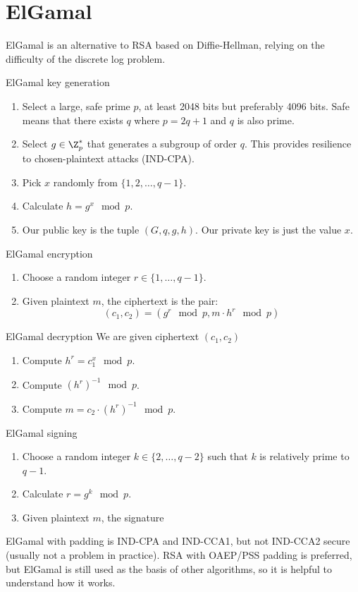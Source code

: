 \section{ElGamal}
ElGamal is an alternative to RSA based on Diffie-Hellman, relying on the difficulty of the discrete log problem.

\begin{tecbox}{ElGamal key generation}{}
    \begin{enumerate}
        \item Select a large, safe prime $p$, at least 2048 bits but preferably 4096 bits. Safe means that there exists $q$ where $p = 2q + 1$ and $q$ is also prime.
        \item Select $g \in \Z_p^*$ that generates a subgroup of order $q$. This provides resilience to chosen-plaintext attacks (IND-CPA).
        \item Pick $x$ randomly from $\{1, 2, \ldots, q -1\}$.
        \item Calculate $h = g^x \mod{p}$.
        \item Our public key is the tuple $(G, q, g, h)$. Our private key is just the value $x$.
    \end{enumerate}
\end{tecbox}

\begin{tecbox}{ElGamal encryption}{}
    \begin{enumerate}
        \item Choose a random integer $r \in \{1, \ldots, q- 1\}$.
        \item Given plaintext $m$, the ciphertext is the pair:
        \[ (c_1, c_2) = (g^r \mod{p}, m \cdot h^r \mod{p}) \]
    \end{enumerate}
\end{tecbox}

\begin{tecbox}{ElGamal decryption}{}
    We are given ciphertext $(c_1, c_2)$
    \begin{enumerate}
        \item Compute $h^r = c_1^x \mod{p}$.
        \item Compute $(h^r)^{-1} \mod{p}$.
        \item Compute $m = c_2 \cdot (h^r)^{-1} \mod{p}$.
    \end{enumerate}
\end{tecbox}

\begin{tecbox}{ElGamal signing}{}
    \begin{enumerate}
        \item Choose a random integer $k \in \{ 2, \ldots, q - 2\}$ such that $k$ is relatively prime to $q-1$.
        \item Calculate $r = g^k \mod p$.
        \item Given plaintext $m$, the signature 
    \end{enumerate}
\end{tecbox}

ElGamal with padding is IND-CPA and IND-CCA1, but not IND-CCA2 secure (usually not a problem in practice). RSA with OAEP/PSS padding is preferred, but ElGamal is still used as the basis of other algorithms, so it is helpful to understand how it works.
